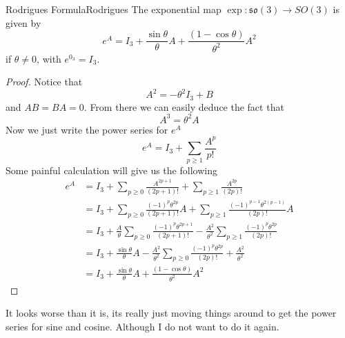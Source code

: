 \begin{boxprop}{Rodrigues Formula}{Rodrigues}
    The exponential map $\exp : \mathfrak{so}(3) \to SO(3)$ is given by
    \begin{equation*}
        e^A = I_3 + \frac{\sin \theta}{\theta}A + \frac{(1-\cos \theta)}{\theta^2}A^2
    \end{equation*}
    if $\theta \neq 0$, with $e^{0_3} = I_3$.

    \begin{proof}
        Notice that
        \begin{equation*}
            A^2 = -\theta^2 I_3 + B
        \end{equation*}
        and $AB=BA=0$.
        From there we can easily deduce the fact that
        \begin{equation*}
            A^3 = \theta^2A
        \end{equation*}
        Now we just write the power series for $e^A$
        \begin{equation*}
            e^A = I_3 + \sum_{p \ge 1}\frac{A^p}{p!}
        \end{equation*}
        Some painful calculation will give us the following
        \begin{align*}
            e^A &= I_3 + \sum_{p\ge 0}\frac{A^{2p+1}}{(2p+1)!} + \sum_{p\ge 1}\frac{A^{2p}}{(2p)!}\\
                &= I_3 + \sum_{p\ge 0}\frac{(-1)^p \theta^{2p}}{(2p+1)!}A + \sum_{p\ge 1}\frac{(-1)^{p-1}\theta^{2(p-1)}}{(2p)!}A\\
                &= I_3 + \frac{A}{\theta}\sum_{p\ge 0}\frac{(-1)^p \theta^{2p+1}}{(2p+1)!} - \frac{A^2}{\theta^2}\sum_{p\ge 1}\frac{(-1)^p\theta^{2p}}{(2p)!}\\
                &= I_3 + \frac{\sin\theta}{\theta}A - \frac{A^2}{\theta^2}\sum_{p\ge 0}\frac{(-1)^p\theta^{2p}}{(2p)!} + \frac{A^2}{\theta^2}\\
                &= I_3 + \frac{\sin\theta}{\theta}A + \frac{(1-\cos\theta)}{\theta^2}A^2
        \end{align*}
    \end{proof}
    It looks worse than it is, its really just moving things around to get the power
    series for sine and cosine. Although I do not want to do it again.
\end{boxprop}

